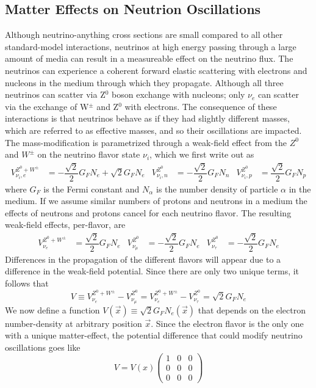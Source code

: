 \documentclass[main.tex]{subfiles}
\begin{document}
\subsection{Matter Effects on Neutrion Oscillations}
Although neutrino-anything cross sections are small compared to all other standard-model interactions, neutrinos at high energy passing through a large amount of media can result in a measureable effect on the neutrino flux. 
The neutrinos can experience a coherent forward elastic scattering with electrons and nucleons in the medium through which they propagate. Although all three neutrinos can scatter via Z$^{0}$ boson exchange with nucleons; only $\nu_{e}$ can scatter via the exchange of W$^{\pm}$ and Z$^{0}$ with electrons. 
The consequence of these interactions is that neutrinos behave as if they had slightly different masses, which are referred to as effective masses, and so their oscillations are impacted.  
The mass-modification is parametrized through a weak-field effect from the $Z^{0}$ and $W^{\pm}$ on the neutrino flavor state $\nu_{i}$, which we first write out as
\begin{align} 
    V_{\nu_{i}, e}^{Z^{0}+W^{\pm}} &= -\dfrac{\sqrt{2}}{2}G_{F} N_{e} + \sqrt{2}G_{F}N_{e}  & V_{\nu_{i}, n}^{Z^{0}} &= -\dfrac{\sqrt{2}}{2}G_{F} N_{n} & V_{\nu_{i}, p}^{Z^{0}} &= \dfrac{\sqrt{2}}{2}G_{F} N_{p}
\end{align}
where $G_{F}$ is the Fermi constant and $N_{\alpha}$ is the number density of particle $\alpha$ in the medium. 
If we assume similar numbers of protons and neutrons in a medium the effects of neutrons and protons cancel for each neutrino flavor. 
The resulting weak-field effects, per-flavor, are
\begin{align} 
    V_{\nu_{e}}^{Z^{0}+W^{\pm}} &= \dfrac{\sqrt{2}}{2}G_{F} N_{e}  & V_{\nu_{\mu}}^{Z^{0}} &= -\dfrac{\sqrt{2}}{2}G_{F} N_{e} & V_{\nu_{\tau}}^{Z^{0}} &= -\dfrac{\sqrt{2}}{2}G_{F} N_{e}
\end{align}
Differences in the propagation of the different flavors will appear due to a difference in the weak-field potential. 
Since there are only two unique terms, it follows that 
\begin{equation}
    V \equiv V_{\nu_{e}}^{Z^{0}+W^{\pm}} -  V_{\nu_{\mu}}^{Z^{0}}  =  V_{\nu_{e}}^{Z^{0}+W^{\pm}} -  V_{\nu_{\tau}}^{Z^{0}}   = \sqrt{2} G_{F} N_{e}
\end{equation}
We now define a function $V(\vec{x})\equiv  \sqrt{2} G_{F} N_{e}(\vec{x})$ that depends on the electron number-density at arbitrary position $\vec{x}$.  
Since the electron flavor is the only one with a unique matter-effect, the potential difference that could modify neutrino oscillations goes like 
\begin{equation}
    V = V(x)\left(\begin{array}{ccc} 1&0&0\\0&0&0 \\0&0&0 \end{array}\right) 
\end{equation}
\end{document}

